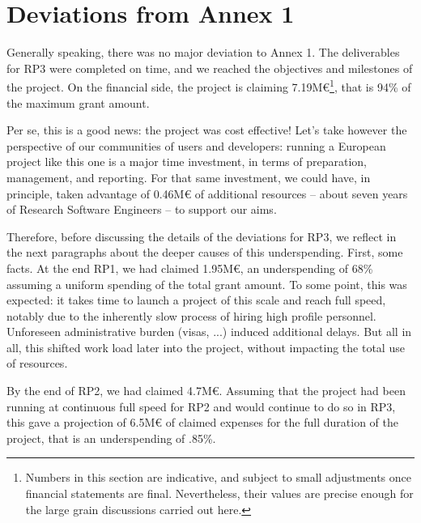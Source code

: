 \section{Deviations from Annex 1}
\label{section.deviations}

Generally speaking, there was no major deviation to Annex 1. The
deliverables for RP3 were completed on time, and we reached the
objectives and milestones of the project. On the financial side, the
project is claiming 7.19M€\footnote{Numbers in this section are
  indicative, and subject to small adjustments once financial
  statements are final. Nevertheless, their values are precise enough
  for the large grain discussions carried out here.}, that is 94\% of
the maximum grant amount.

Per se, this is a good news: the project was cost effective! Let's
take however the perspective of our communities of users and
developers: running a European project like this one is a major time
investment, in terms of preparation, management, and reporting. For
that same investment, we could have, in principle, taken advantage of
0.46M€ of additional resources -- about seven years of Research
Software Engineers -- to support our aims.

Therefore, before discussing the details of the deviations for RP3, we
reflect in the next paragraphs about the deeper causes of this
underspending. First, some facts. At the end RP1, we had claimed
1.95M€, an underspending of 68\% assuming a uniform spending of the
total grant amount. To some point, this was expected: it takes time to
launch a project of this scale and reach full speed, notably due to
the inherently slow process of hiring high profile personnel.
Unforeseen administrative burden (visas, ...) induced additional
delays. But all in all, this shifted work load later into the project,
without impacting the total use of resources.

By the end of RP2, we had claimed 4.7M€. Assuming that the project had
been running at continuous full speed for RP2 and would continue to do
so in RP3, this gave a projection of 6.5M€ of claimed expenses for the
full duration of the project, that is an underspending of .85\%.

